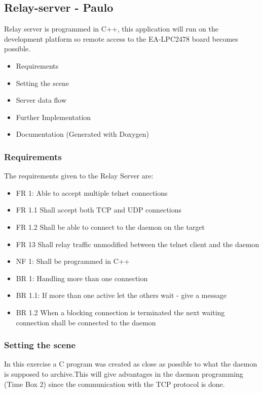 \subsection{Relay-server - Paulo}
Relay server is programmed in C++, this application will run on the development platform so remote access to the EA-LPC2478 board becomes possible.

\begin{itemize}
	\item Requirements
	\item Setting the scene
	\item Server data flow
	\item Further Implementation
	\item Documentation (Generated with Doxygen)
\end{itemize}

\subsubsection{Requirements}
The requirements given to the Relay Server are:

\begin{itemize}
	\item FR 1: Able to accept multiple telnet connections
	\item FR 1.1 Shall accept both TCP and UDP connections
 	\item FR 1.2 Shall be able to connect to the daemon on the target
 	\item FR 13 Shall relay traffic unmodified between the telnet client and the daemon
 	\item NF 1: Shall be programmed in C++
 	\item BR 1: Handling more than one connection
 	\item BR 1.1: If more than one active let the others wait - give a message
 	\item BR 1.2 When a blocking connection is terminated the next waiting connection shall be connected to the daemon
\end{itemize}

\subsubsection{Setting the scene}
In this exercise a C program was created as close as possible to what the daemon is supposed to archive.This will give advantages in the daemon programming (Time Box 2) since the communication with the TCP protocol is done.

